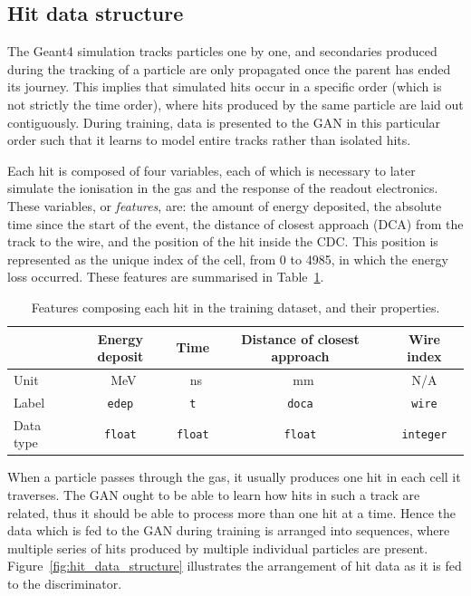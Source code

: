 \subsection{Hit data structure}\label{sec:hit_data_structure}

The {\sc Geant4} simulation tracks particles one by one, and secondaries produced during the tracking of a particle are only propagated once the parent has ended its journey. This implies that simulated hits occur in a specific order (which is not strictly the time order), where hits produced by the same particle are laid out contiguously. During training, data is presented to the GAN in this particular order such that it learns to model entire tracks rather than isolated hits.

Each hit is composed of four variables, each of which is necessary to later simulate the ionisation in the gas and the response of the readout electronics. These variables, or \emph{features}, are: the amount of energy deposited, the absolute time since the start of the event, the distance of closest approach (DCA) from the track to the wire, and the position of the hit inside the CDC. This position is represented as the unique index of the cell, from 0 to 4985, in which the energy loss occurred. These features are summarised in Table~\ref{tab:gan_features}.

\begin{table}
    \setlength{\tabcolsep}{12pt}
    \centering
    \begin{tabular}{l|cccc}
        \toprule
        & \bfseries Energy deposit & \bfseries Time & \bfseries Distance of closest approach & \bfseries Wire index  \\
        \midrule
        Unit & \SI{}{\MeV} & \SI{}{\ns} & \SI{}{\mm} & N/A \\
        Label & \texttt{edep} & \texttt{t} & \texttt{doca} & \texttt{wire} \\
        Data type & \texttt{float} & \texttt{float} & \texttt{float} & \texttt{integer}
        \\\bottomrule
    \end{tabular}
    \caption{Features composing each hit in the training dataset, and their properties.}
    \label{tab:gan_features}
\end{table}

When a particle passes through the gas, it usually produces one hit in each cell it traverses. The GAN ought to be able to learn how hits in such a track are related, thus it should be able to process more than one hit at a time. Hence the data which is fed to the GAN during training is arranged into sequences, where multiple series of hits produced by multiple individual particles are present. Figure~\ref{fig:hit_data_structure} illustrates the arrangement of hit data as it is fed to the discriminator. 


